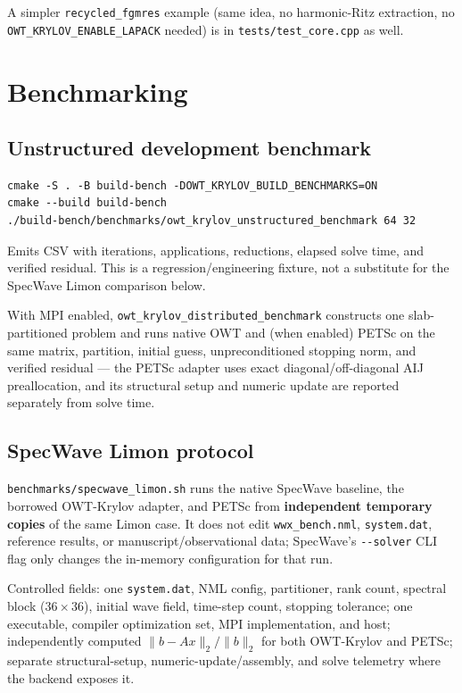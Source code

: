 \documentclass[11pt,a4paper]{report}
\begin{document}
A simpler \lstinline!recycled_fgmres! example (same idea, no harmonic-Ritz
extraction, no \lstinline!OWT_KRYLOV_ENABLE_LAPACK! needed) is in
\texttt{tests/test\_core.cpp} as well.

\chapter{Benchmarking}
\label{sec:12}

\section{Unstructured development benchmark}
\label{sec:12.1}

\begin{lstlisting}[style=bashstyle]
cmake -S . -B build-bench -DOWT_KRYLOV_BUILD_BENCHMARKS=ON
cmake --build build-bench
./build-bench/benchmarks/owt_krylov_unstructured_benchmark 64 32
\end{lstlisting}

Emits CSV with iterations, applications, reductions, elapsed solve
time, and verified residual. This is a regression/engineering fixture,
not a substitute for the SpecWave Limon comparison below.

With MPI enabled, \lstinline!owt_krylov_distributed_benchmark! constructs
one slab-partitioned problem and runs native OWT and (when enabled)
PETSc on the same matrix, partition, initial guess, unpreconditioned
stopping norm, and verified residual --- the PETSc adapter uses exact
diagonal/off-diagonal AIJ preallocation, and its structural setup and
numeric update are reported separately from solve time.

\section{SpecWave Limon protocol}
\label{sec:12.2}

\texttt{benchmarks/specwave\_limon.sh} runs the native SpecWave
baseline, the borrowed OWT-Krylov adapter, and PETSc from
\textbf{independent temporary copies} of the same Limon case. It does
not edit \texttt{wwx\_bench.nml}, \texttt{system.dat}, reference
results, or manuscript/observational data; SpecWave's \lstinline!--solver!
CLI flag only changes the in-memory configuration for that run.

Controlled fields: one \texttt{system.dat}, NML config, partitioner,
rank count, spectral block ($36\times36$), initial wave field,
time-step count, stopping tolerance; one executable, compiler
optimization set, MPI implementation, and host; independently computed
$\|b-Ax\|_2/\|b\|_2$ for both OWT-Krylov and PETSc; separate
structural-setup, numeric-update/assembly, and solve telemetry where
the backend exposes it.
\end{document}
